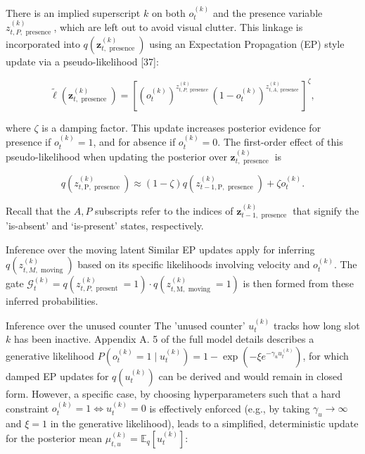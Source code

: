 \documentclass[10pt]{article}
\begin{document}
There is an implied superscript $k$ on both $o_{t}^{(k)}$ and the presence variable $z_{t, P, \text { presence }}^{(k)}$, which are left out to avoid visual clutter. This linkage is incorporated into $q\left(\mathbf{z}_{t, \text { presence }}^{(k)}\right)$ using an Expectation Propagation (EP) style update via a pseudo-likelihood [37]:


\begin{equation*}
\tilde{\ell}\left(\mathbf{z}_{t, \text { presence }}^{(k)}\right)=\left[\left(o_{t}^{(k)}\right)^{z_{t, P, \text { presence }}^{(k)}}\left(1-o_{t}^{(k)}\right)^{z_{t, A, \text { presence }}^{(k)}}\right]^{\zeta}, \tag{45}
\end{equation*}


where $\zeta$ is a damping factor. This update increases posterior evidence for presence if $o_{t}^{(k)}=1$, and for absence if $o_{t}^{(k)}=0$. The first-order effect of this pseudo-likelihood when updating the posterior over $\mathbf{z}_{t, \text { presence }}^{(k)}$ is


\begin{equation*}
q\left(z_{t, \mathrm{P}, \text { presence }}^{(k)}\right) \approx(1-\zeta) q\left(z_{t-1, \mathrm{P}, \text { presence }}^{(k)}\right)+\zeta o_{t}^{(k)} . \tag{46}
\end{equation*}


Recall that the $A, P$ subscripts refer to the indices of $\mathbf{z}_{t-1, \text { presence }}^{(k)}$ that signify the 'is-absent' and ‘is-present’ states, respectively.

Inference over the moving latent Similar EP updates apply for inferring $q\left(z_{t, M, \text { moving }}^{(k)}\right)$ based on its specific likelihoods involving velocity and $o_{t}^{(k)}$. The gate $\mathcal{G}_{t}^{(k)}=q\left(z_{t, P, \text { present }}^{(k)}=1\right) \cdot q\left(z_{t, \mathrm{M}, \text { moving }}^{(k)}=1\right)$ is then formed from these inferred probabilities.

Inference over the unused counter The 'unused counter' $u_{t}^{(k)}$ tracks how long slot $k$ has been inactive. Appendix A. 5 of the full model details describes a generative likelihood $P\left(o_{t}^{(k)}=1 \mid\right. \left.u_{t}^{(k)}\right)=1-\exp \left(-\xi e^{-\gamma_{u} u_{t}^{(k)}}\right)$, for which damped EP updates for $q\left(u_{t}^{(k)}\right)$ can be derived and would remain in closed form. However, a specific case, by choosing hyperparameters such that a hard constraint $o_{t}^{(k)}=1 \Longleftrightarrow u_{t}^{(k)}=0$ is effectively enforced (e.g., by taking $\gamma_{u} \rightarrow \infty$ and $\xi=1$ in the generative likelihood), leads to a simplified, deterministic update for the posterior mean $\mu_{t, u}^{(k)}=\mathbb{E}_{q}\left[u_{t}^{(k)}\right]:$
\end{document}
